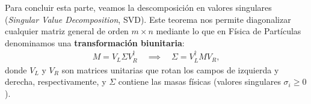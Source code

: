 \documentclass[12pt]{article}
\begin{document}
% 
Para concluir esta parte, veamos la descomposición en valores singulares 
(\textit{Singular Value Decomposition}, SVD). Este teorema nos permite diagonalizar 
cualquier matriz general de orden $m \times n$ mediante lo que en Física de Partículas 
denominamos una \textbf{transformación biunitaria}:
%
\begin{align*}
   M = V_L \Sigma V_R^\dagger \quad \implies \quad \Sigma = V_L^\dagger M V_R,
\end{align*}
%
donde $V_L$ y $V_R$ son matrices unitarias que rotan los campos de izquierda y derecha, 
respectivamente, y $\Sigma$ contiene las masas 
físicas (valores singulares $\sigma_i \ge 0$). 

\begin{table}[h!]
\centering
\caption{Paralelo entre la notación de física de partículas y la notación estándar de SVD en álgebra lineal.}
\label{tab:paralelo_svd}
\vspace{0.2cm}
\end{table}
\end{document}
